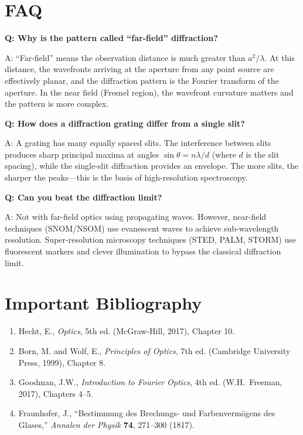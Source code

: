 \section*{FAQ}

\textbf{Q: Why is the pattern called ``far-field'' diffraction?}

A: ``Far-field'' means the observation distance is much greater than $a^2/\lambda$. At this distance, the wavefronts arriving at the aperture from any point source are effectively planar, and the diffraction pattern is the Fourier transform of the aperture. In the near field (Fresnel region), the wavefront curvature matters and the pattern is more complex.

\textbf{Q: How does a diffraction grating differ from a single slit?}

A: A grating has many equally spaced slits. The interference between slits produces sharp principal maxima at angles $\sin\theta = n\lambda/d$ (where $d$ is the slit spacing), while the single-slit diffraction provides an envelope. The more slits, the sharper the peaks---this is the basis of high-resolution spectroscopy.

\textbf{Q: Can you beat the diffraction limit?}

A: Not with far-field optics using propagating waves. However, near-field techniques (SNOM/NSOM) use evanescent waves to achieve sub-wavelength resolution. Super-resolution microscopy techniques (STED, PALM, STORM) use fluorescent markers and clever illumination to bypass the classical diffraction limit.
\section*{Important Bibliography}

\begin{enumerate}
\item Hecht, E., \textit{Optics}, 5th ed. (McGraw-Hill, 2017), Chapter 10.
\item Born, M. and Wolf, E., \textit{Principles of Optics}, 7th ed. (Cambridge University Press, 1999), Chapter 8.
\item Goodman, J.W., \textit{Introduction to Fourier Optics}, 4th ed. (W.H.\ Freeman, 2017), Chapters 4--5.
\item Fraunhofer, J., ``Bestimmung des Brechungs- und Farbenverm\"ogens des Glases,'' \textit{Annalen der Physik} \textbf{74}, 271--300 (1817).
\end{enumerate}

